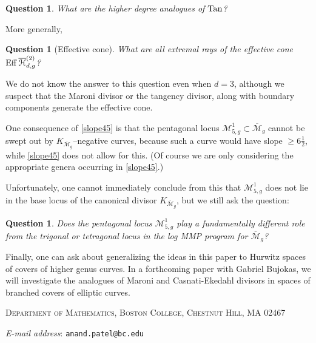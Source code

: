 \documentclass[reqno, 10 pt]{article}
\newtheorem{question}[thm]{Question}
\theoremstyle{definition}
\theoremstyle{remark}
\numberwithin{equation}{section}
\numberwithin{thm}{section}
\numberwithin{prop}{section}
\numberwithin{lem}{section}
\numberwithin{cor}{section}
\numberwithin{conj}{section}
\numberwithin{defn}{section}
\renewcommand{\H}{\mathcal H}
\newcommand{\Hdgnt}{\overline{\H}_{d,g}^{(2)}}
\newcommand{\Mg}{{\overline{\mathcal{M}}_{g}}}
\newcommand{\cM}{{\mathcal M}}
\renewcommand{\H}{{\mathcal{H}}}
\newcommand {\Eff}{{\rm Eff}\,}
\begin{document}
\begin{question}
What are the higher degree analogues of ${\rm Tan}$?
\end{question}

More generally, 

\begin{question}[Effective cone]
What are all extremal rays of the effective cone $\Eff \Hdgnt$?
\end{question}

We do not know the answer to this question even when $d=3$, although we suspect that the Maroni divisor or the tangency divisor, along with boundary components generate the effective cone. 

One consequence of \autoref{slope45} is that the pentagonal locus $\cM^{1}_{5,g} \subset \Mg$ cannot be swept out by $K_{\Mg}$--negative curves, because such a curve would have slope $\geq 6 \frac{1}{2}$, while \autoref{slope45} does not allow for this. (Of course we are only considering the appropriate genera occurring in \autoref{slope45}.)

Unfortunately, one cannot immediately conclude from this that $\cM^{1}_{5,g}$ does not lie in the base locus of the canonical divisor $K_{\Mg}$, but we still ask the question:

\begin{question}
Does the pentagonal locus $\cM^{1}_{5,g}$ play a fundamentally different role from the trigonal or tetragonal locus in the log MMP program for $\Mg$?
\end{question}

Finally, one can ask about generalizing the ideas in this paper to Hurwitz spaces of covers of higher genus curves.  In a forthcoming paper with Gabriel Bujokas, we will investigate the analogues of Maroni and Casnati-Ekedahl divisors in spaces of branched covers of elliptic curves. 


   
   

\newcommand{\Addresses}{{\bigskip
  \footnotesize

 \textsc{Department of Mathematics, Boston College, Chestnut Hill, MA 02467}
 \par\nopagebreak
  \textit{E-mail address}: \texttt{anand.patel@bc.edu}
}}

\Addresses


  
\end{document}
